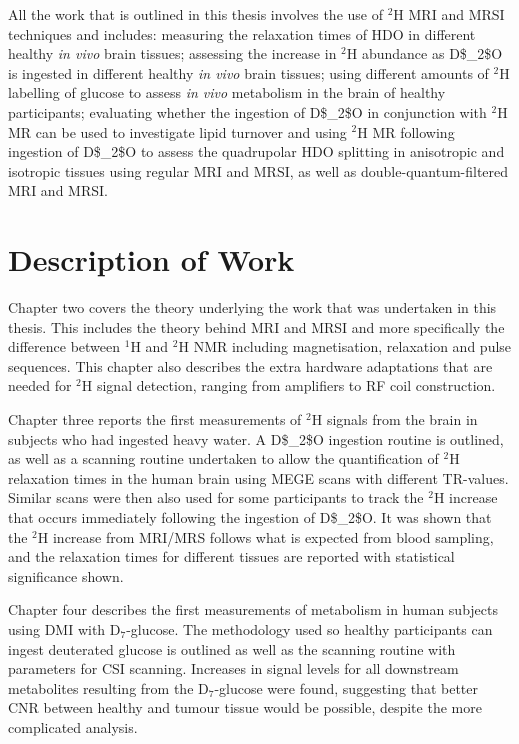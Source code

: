 All the work that is outlined in this thesis involves the use of $^2$H \ac{MRI} and \ac{MRSI} techniques and includes: measuring the relaxation times of \ac{HDO} in different healthy \textit{in vivo} brain tissues; assessing the increase in $^2$H abundance as \Ac{D$_2$O} is ingested in different healthy \textit{in vivo} brain tissues; using different amounts of $^2$H labelling of glucose to assess \textit{in vivo} metabolism in the brain of healthy participants; evaluating whether the ingestion of \Ac{D$_2$O} in conjunction with $^2$H MR can be used to investigate lipid turnover and using $^2$H MR following ingestion of \Ac{D$_2$O} to assess the quadrupolar \ac{HDO} splitting in anisotropic and isotropic tissues using regular \ac{MRI} and \ac{MRSI}, as well as double-quantum-filtered \ac{MRI} and MRSI.

\section{Description of Work}

Chapter two covers the theory underlying the work that was undertaken in this thesis. This includes the theory behind \ac{MRI} and \ac{MRSI} and more specifically the difference between $^1$H and $^2$H \ac{NMR} including magnetisation, relaxation and pulse sequences. This chapter also describes the extra hardware adaptations that are needed for $^2$H signal detection, ranging from amplifiers to \ac{RF} coil construction.

Chapter three reports the first measurements of $^2$H signals from the brain in subjects who had ingested heavy water. A \ac{D$_2$O} ingestion routine is outlined, as well as a scanning routine undertaken to allow the quantification of $^2$H relaxation times in the human brain using \ac{MEGE} scans with different \ac{TR}-values. Similar scans were then also used for some participants to track the $^2$H increase that occurs immediately following the ingestion of \ac{D$_2$O}. It was shown that the $^2$H increase from \ac{MRI}/\ac{MRS} follows what is expected from blood sampling, and the relaxation times for different tissues are reported with statistical significance shown.


Chapter four describes the first measurements of metabolism in human subjects using \ac{DMI} with D$_7$-glucose. The methodology used so healthy participants can ingest deuterated glucose is outlined as well as the scanning routine with parameters for CSI scanning. Increases in signal levels for all downstream metabolites resulting from the D$_7$-glucose were found, suggesting that better \ac{CNR} between healthy and tumour tissue would be possible, despite the more complicated analysis.

